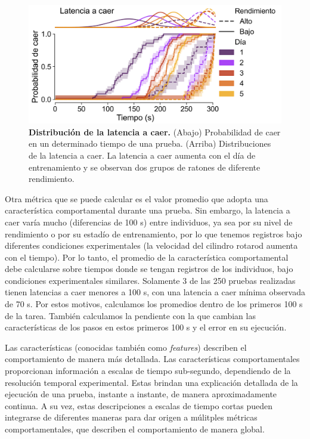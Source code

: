 \begin{figure}[htbp]
    \centering
    \includegraphics[width=0.8\linewidth]{figuras/capitulo3/probabilidad_caer_por_rendimiento.png}
    \caption{\textbf{Distribución de la latencia a caer.} (Abajo) Probabilidad de caer en un determinado tiempo de una prueba. (Arriba) Distribuciones de la latencia a caer.
        La latencia a caer aumenta con el día de entrenamiento y se observan dos grupos de ratones de diferente rendimiento.}
    \label{fig:capitulo3_probabilidad_caer_por_rendimiento}
\end{figure}

Otra métrica que se puede calcular es el valor promedio que adopta una característica comportamental durante una prueba. Sin embargo, la latencia a caer varía mucho (diferencias de 100 s) entre individuos, ya sea por su nivel de rendimiento o por su estadío de entrenamiento, por lo que tenemos registros bajo diferentes condiciones experimentales (la velocidad del cilindro rotarod aumenta con el tiempo). Por lo tanto, el promedio de la característica comportamental debe calcularse sobre tiempos donde se tengan registros de los individuos, bajo condiciones experimentales similares. Solamente 3 de las 250 pruebas realizadas tienen latencias a caer menores a 100 s, con una latencia a caer mínima observada de 70 s. Por estos motivos, calculamos los promedios dentro de los primeros 100 s de la tarea. También calculamos la pendiente con la que cambian las características de los pasos en estos primeros 100 s y el error en su ejecución.

Las características (conocidas también como \textit{features}) describen el comportamiento de manera más detallada. Las características comportamentales proporcionan información a escalas de tiempo sub-segundo, dependiendo de la resolución temporal experimental. Estas brindan una explicación detallada de la ejecución de una prueba, instante a instante, de manera aproximadamente continua. A su vez, estas descripciones a escalas de tiempo cortas pueden integrarse de diferentes maneras para dar origen a múlitples métricas comportamentales, que describen el comportamiento de manera global.


